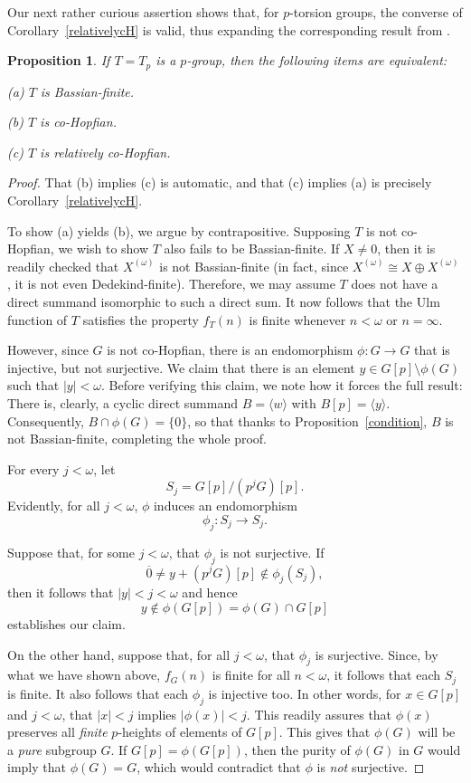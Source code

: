 \documentclass[12pt]{amsart}
\newtheorem{proposition}[theorem]{Proposition}
\theoremstyle{definition}
\def\val#1{\vert #1 \vert}
\begin{document}
Our next rather curious assertion shows that, for $p$-torsion groups, the converse of Corollary~\ref{relativelycH} is valid, thus expanding the corresponding result from \cite{CDK}.

\begin{proposition}\label{torsion}
If $T=T_p$ is a $p$-group, then the following items are equivalent:

(a) $T$ is Bassian-finite.

(b) $T$ is co-Hopfian.

(c) $T$ is relatively co-Hopfian.
\end{proposition}

\begin{proof} That (b) implies (c) is automatic, and that (c) implies (a) is precisely Corollary~\ref{relativelycH}.

To show (a) yields (b), we argue by contrapositive. Supposing $T$ is not co-Hopfian, we wish to show $T$ also fails to be Bassian-finite. If $X\neq 0$, then it is readily checked that $X^{(\omega)}$ is not Bassian-finite (in fact, since $X^{(\omega)}\cong X\oplus X^{(\omega)}$, it is not even Dedekind-finite). Therefore, we may assume $T$ does not have a direct summand isomorphic to such a direct sum. It now follows that the Ulm function of $T$ satisfies the property $f_T(n)$ is finite whenever $n<\omega $ or $n=\infty$.

However, since $G$ is not co-Hopfian, there is an endomorphism $\phi:G\to G$ that is injective, but not surjective.
We claim that there is an element $y\in G[p]\setminus \phi(G)$ such that $\val y<\omega$. Before verifying this claim, we note how it forces the full result: There is, clearly, a cyclic direct summand $B=\langle w\rangle$ with $B[p]=\langle y\rangle$. Consequently, $B\cap \phi(G)=\{0\}$, so that thanks to Proposition~\ref{condition}, $B$ is not Bassian-finite, completing the whole proof.

For every $j<\omega$, let
$$
S_j=G[p]/(p^j G)[p].
$$
Evidently, for all $j<\omega$, $\phi$ induces an endomorphism
$$
                            \phi_j: S_j \to S_j.
$$

Suppose that, for some $j<\omega $, that $\phi_j$ is not surjective. If $$\overline{0}\ne y+(p^j G)[p]\not\in \phi_j(S_j),$$ then it follows that $\val y<j<\omega$ and hence $$y\not\in \phi(G[p])=\phi(G)\cap G[p]$$ establishes our claim.

On the other hand, suppose that, for all $j<\omega$, that $\phi_j$ is surjective. Since, by what we have shown above, $f_G(n)$ is finite for all $n<\omega$, it follows that each $S_j$ is finite. It also follows that each $\phi_j$ is injective too. In other words, for $x\in G[p]$ and $j<\omega$, that $\val x<j$ implies $\val {\phi(x)}<j$. This readily assures that $\phi(x)$ preserves all {\it finite} $p$-heights of elements of $G[p]$. This gives that $\phi(G)$ will be a {\it pure} subgroup $G$. If $G[p]=\phi(G[p])$, then the purity of $\phi(G)$ in $G$ would imply that $\phi(G)=G$, which would contradict that $\phi$ is {\it not} surjective.


\end{proof}
\end{document}
